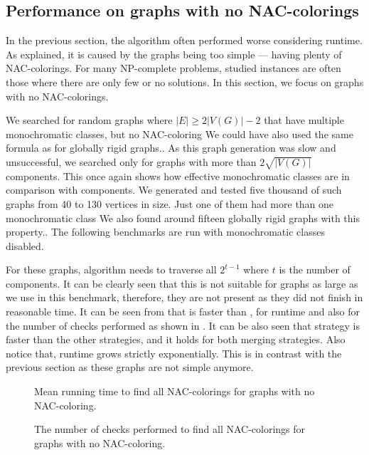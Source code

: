 \subsection{Performance on graphs with no NAC-colorings}

In the previous section, the \Subgraphs{} algorithm
often performed worse considering runtime.
As explained, it is caused by the graphs being too simple
--- having plenty of NAC-colorings.
%
For many NP-complete problems, studied instances are often
those where there are only few or no solutions.
In this section, we focus on graphs with no NAC-colorings.

We searched for random graphs where \( |E| \ge 2|V(G)| - 2 \) that have
multiple monochromatic classes, but no NAC-coloring
{We could have also used the same formula as for globally rigid graphs.}.
%
As this graph generation was slow and unsuccessful, we searched only for
graphs with more than \( 2\sqrt{|V(G)|} \) \trcon{} components.
%
This once again shows how effective monochromatic classes are
in comparison with \trcon{} components.
We generated and tested five thousand of such graphs from 40 to 130 vertices in size.
Just one of them had more than one monochromatic class
{We also found around fifteen globally rigid graphs with this property.}.
%
The following benchmarks are run with monochromatic classes disabled.

For these graphs, \NaiveCycles{} algorithm needs to traverse all \( 2^{t-1} \)
where \( t \) is the number of \trcon{} components. It can be clearly seen that
this is not suitable for graphs as large as we use in this benchmark,
therefore, they are not present as they did not finish in reasonable time.
It can be seen from 
that \SharedVertices{} is faster than \MergeLinear{},
for runtime and also for the number of checks performed
as shown in .
%
It can be also seen that \NeighborsDegree{} strategy is
faster than the other strategies, and it holds for both merging strategies.
Also notice that,
runtime grows strictly exponentially.
This is in contrast with the previous section
as these graphs are not simple anymore.

\begin{figure}[thbp]
	\centering
	\scalebox{\BenchFigureScale}{}
	\caption[Mean runtime for graphs with no NAC-coloring.]{
		Mean running time to find all NAC-colorings for graphs with no NAC-coloring.}%
	\label{fig:graph_no_nac_coloring_first_runtime}
\end{figure}%
\begin{figure}[thbp]
	\centering
	\scalebox{\BenchFigureScale}{}
	\caption[Checks performed for graphs with no NAC-coloring.]{
		The number of checks performed to find all NAC-colorings for graphs with no NAC-coloring.}%
	\label{fig:graph_no_nac_coloring_first_checks}
\end{figure}%

